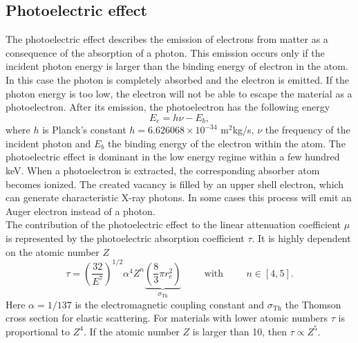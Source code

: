 \subsection{Photoelectric effect}
The photoelectric effect describes the emission of electrons from matter as a consequence of the absorption of a photon. This emission occurs only if the incident photon energy is larger than the binding energy of electron in the atom. In this case the photon is completely absorbed and the electron is emitted. If the photon energy is too low, the electron will not be able to escape the material as a photoelectron. After its emission, the photoelectron has the following energy
\begin{equation}
E_e = h\nu - E_b,
\end{equation}
where $h$ is Planck's  constant $h = 6.626068 \times 10^{-34}$ m$^2$kg/s, $\nu$ the frequency of the incident photon and $E_b$ the binding energy of the electron within the atom. The photoelectric effect is dominant in the low energy regime within a few hundred keV. When a photoelectron is extracted, the corresponding absorber atom becomes ionized. The created vacancy is filled by an upper shell electron, which can generate characteristic X-ray photons. In some cases this process will emit an Auger electron instead of a photon.\\The contribution of the photoelectric effect to the linear attenuation coefficient $\mu$ is represented by the photoelectric absorption coefficient $\tau$. It is highly dependent on the atomic number $Z$ \cite{Bethge}
\begin{equation}
\tau = \left(\frac{32}{E^7}\right)^{1/2}\alpha^4Z^n\underbrace{\left(\frac{8}{3}\pi r_e^2\right)}_{\sigma_\mathrm{Th}}\hspace{1cm}\mathrm{with}\hspace{1cm}n\in [4,5].
\end{equation}
Here $\alpha=1/137$ is the electromagnetic coupling constant and $\sigma_\mathrm{Th}$ the Thomson cross section for elastic scattering. For materials with lower atomic numbers $\tau$ is proportional to $Z^4$. If the atomic number $Z$ is larger than 10, then $\tau \propto Z^5$.

